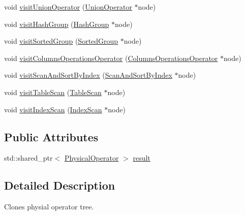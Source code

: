 \begin{DoxyCompactItemize}
\item 
void \hyperlink{class_cloning_physical_operator_visitor_af9199524feba8c12ceff7d78c1915064}{visit\+Union\+Operator} (\hyperlink{class_union_operator}{Union\+Operator} $\ast$node)
\item 
void \hyperlink{class_cloning_physical_operator_visitor_aa3a6b9d8327700089089e57e18861d6d}{visit\+Hash\+Group} (\hyperlink{class_hash_group}{Hash\+Group} $\ast$node)
\item 
void \hyperlink{class_cloning_physical_operator_visitor_a464894a18b7194c57e0c8d16f901ff5b}{visit\+Sorted\+Group} (\hyperlink{class_sorted_group}{Sorted\+Group} $\ast$node)
\item 
void \hyperlink{class_cloning_physical_operator_visitor_ad818258fa87a049e49d255107f655819}{visit\+Columns\+Operations\+Operator} (\hyperlink{class_columns_operations_operator}{Columns\+Operations\+Operator} $\ast$node)
\item 
void \hyperlink{class_cloning_physical_operator_visitor_a5bead629c3b23b39316b8b86913617e7}{visit\+Scan\+And\+Sort\+By\+Index} (\hyperlink{class_scan_and_sort_by_index}{Scan\+And\+Sort\+By\+Index} $\ast$node)
\item 
void \hyperlink{class_cloning_physical_operator_visitor_aa7066c58c8963023737f1b8e0eca7bca}{visit\+Table\+Scan} (\hyperlink{class_table_scan}{Table\+Scan} $\ast$node)
\item 
void \hyperlink{class_cloning_physical_operator_visitor_ae5e119521bb2d4654eebba24bc469739}{visit\+Index\+Scan} (\hyperlink{class_index_scan}{Index\+Scan} $\ast$node)
\end{DoxyCompactItemize}
\subsection*{Public Attributes}
\begin{DoxyCompactItemize}
\item 
std\+::shared\+\_\+ptr$<$ \hyperlink{class_physical_operator}{Physical\+Operator} $>$ \hyperlink{class_cloning_physical_operator_visitor_aa3705b767976ef07fdfe39458543138e}{result}
\end{DoxyCompactItemize}


\subsection{Detailed Description}
Clones physial operator tree. 

